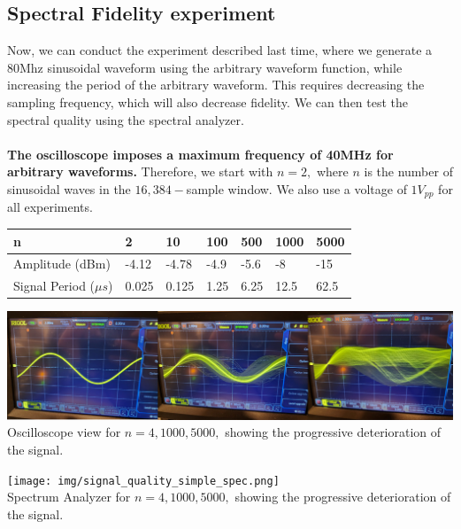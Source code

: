 \documentclass{article}
\begin{document}
    \subsection*{Spectral Fidelity experiment}
    Now, we can conduct the experiment described last time, where we generate a 80Mhz sinusoidal waveform using the arbitrary waveform function, while increasing the period of the arbitrary waveform. This requires decreasing the sampling frequency, which will also decrease fidelity. We can then test the spectral quality using the spectral analyzer.\\\\
    \textbf{The oscilloscope imposes a maximum frequency of 40MHz for arbitrary waveforms.} Therefore, we start with $n=2,$ where $n$ is the number of sinusoidal waves in the $16,384-$sample window. We also use a voltage of $1V_{pp}$ for all experiments.
    \begin{table}[H]
    \centering
    \begin{tabular}{|l|l|l|l|l|l|l|}
    \hline
    n & 2 & 10 & 100 & 500 & 1000 & 5000 \\ \hline
    Amplitude (dBm) & -4.12 & -4.78 & -4.9 & -5.6 & -8 & -15 \\ \hline
    Signal Period ($\mu s$) & 0.025 & 0.125 & 1.25 & 6.25 & 12.5 & 62.5 \\ \hline
    \end{tabular}
    \end{table}
    \begin{mdframed}[backgroundcolor=gray!20, align = center, userdefinedwidth = 6in]
    \includegraphics[width = 5.8in]{img/signal_quality_simple.png}\\
    Oscilloscope view for $n = 4, 1000, 5000,$ showing the progressive deterioration of the signal.
    \end{mdframed}
    \begin{mdframed}[backgroundcolor=gray!20, align = center, userdefinedwidth = 6in]
    \texttt{[image: img/signal\_quality\_simple\_spec.png]}\\
    Spectrum Analyzer for $n = 4, 1000, 5000,$ showing the progressive deterioration of the signal.
    \end{mdframed}
\end{document}
